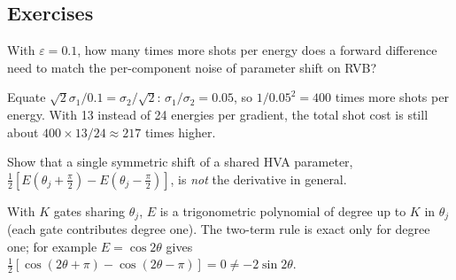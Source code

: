 \subsection*{Exercises}

\begin{exer}
  With $\varepsilon=0.1$, how many times more shots per energy does a forward difference need to
  match the per-component noise of parameter shift on RVB?
\end{exer}
\begin{sol}
  Equate $\sqrt2\sigma_1/0.1=\sigma_2/\sqrt2$: $\sigma_1/\sigma_2=0.05$, so $1/0.05^2=400$ times
  more shots per energy. With 13 instead of 24 energies per gradient, the total shot cost is still
  about $400\times13/24\approx217$ times higher.
\end{sol}

\begin{exer}
  Show that a single symmetric shift of a shared HVA parameter, $\tfrac12[E(\theta_j+\tfrac\pi2)-E(\theta_j-\tfrac\pi2)]$,
  is \emph{not} the derivative in general.
\end{exer}
\begin{sol}
  With $K$ gates sharing $\theta_j$, $E$ is a trigonometric polynomial of degree up to $K$ in
  $\theta_j$ (each gate contributes degree one). The two-term rule is exact only for degree one;
  for example $E=\cos2\theta$ gives $\tfrac12[\cos(2\theta+\pi)-\cos(2\theta-\pi)]=0\neq-2\sin2\theta$.
\end{sol}
